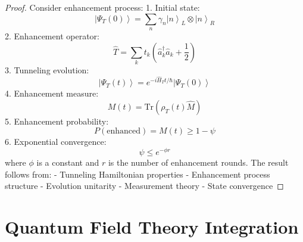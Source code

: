 \documentclass[12pt]{article}
\newcommand{\ket}[1]{\left|#1\right\rangle}
\newcommand{\tr}{\text{Tr}}
\newcommand{\op}[1]{\hat{#1}}
\begin{document}
\begin{proof}
Consider enhancement process:
1. Initial state:
\begin{equation}
\ket{\Psi_T(0)} = \sum_n \gamma_n\ket{n}_L \otimes \ket{n}_R
\end{equation}
2. Enhancement operator:
\begin{equation}
\op{T} = \sum_k t_k(\op{a}_k^\dagger\op{a}_k + \frac{1}{2})
\end{equation}
3. Tunneling evolution:
\begin{equation}
\ket{\Psi_T(t)} = e^{-i\op{H}_Tt/\hbar}\ket{\Psi_T(0)}
\end{equation}
4. Enhancement measure:
\begin{equation}
M(t) = \tr(\rho_T(t)\op{M})
\end{equation}
5. Enhancement probability:
\begin{equation}
P(\text{enhanced}) = M(t) \geq 1 - \psi
\end{equation}
6. Exponential convergence:
\begin{equation}
\psi \leq e^{-\phi r}
\end{equation}
where $\phi$ is a constant and $r$ is the number of enhancement rounds.
The result follows from:
- Tunneling Hamiltonian properties
- Enhancement process structure
- Evolution unitarity
- Measurement theory
- State convergence
\end{proof}
\section{Quantum Field Theory Integration}
\end{document}
